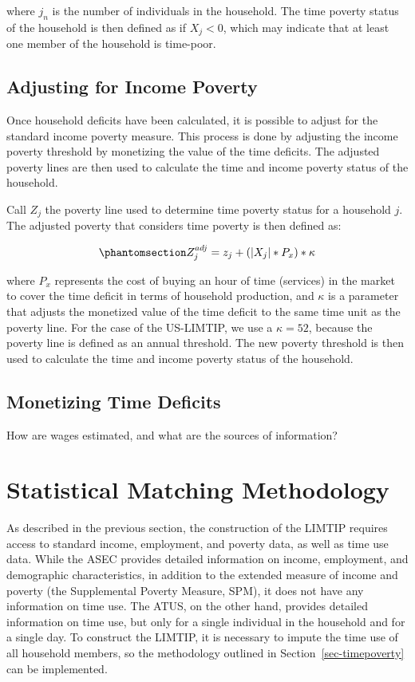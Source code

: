 \documentclass[
  11pt,
]{article}
\begin{document}
where \(j_n\) is the number of individuals in the household. The time
poverty status of the household is then defined as if \(X_j < 0\), which
may indicate that at least one member of the household is time-poor.

\subsection{Adjusting for Income
Poverty}\label{adjusting-for-income-poverty}

Once household deficits have been calculated, it is possible to adjust
for the standard income poverty measure. This process is done by
adjusting the income poverty threshold by monetizing the value of the
time deficits. The adjusted poverty lines are then used to calculate the
time and income poverty status of the household.

Call \(Z_j\) the poverty line used to determine time poverty status for
a household \(j\). The adjusted poverty that considers time poverty is
then defined as:

\begin{equation}\phantomsection\label{eq-adjpline}{Z_j^{adj} = z_j + (|X_j| * P_x)*\kappa}\end{equation}

where \(P_x\) represents the cost of buying an hour of time (services)
in the market to cover the time deficit in terms of household
production, and \(\kappa\) is a parameter that adjusts the monetized
value of the time deficit to the same time unit as the poverty line. For
the case of the US-LIMTIP, we use a \(\kappa=52\), because the poverty
line is defined as an annual threshold. The new poverty threshold is
then used to calculate the time and income poverty status of the
household.

\subsection{Monetizing Time Deficits}\label{monetizing-time-deficits}

How are wages estimated, and what are the sources of information?

\section{Statistical Matching Methodology}\label{sec-smatch}

As described in the previous section, the construction of the LIMTIP
requires access to standard income, employment, and poverty data, as
well as time use data. While the ASEC provides detailed information on
income, employment, and demographic characteristics, in addition to the
extended measure of income and poverty (the Supplemental Poverty
Measure, SPM), it does not have any information on time use. The ATUS,
on the other hand, provides detailed information on time use, but only
for a single individual in the household and for a single day. To
construct the LIMTIP, it is necessary to impute the time use of all
household members, so the methodology outlined in
Section~\ref{sec-timepoverty} can be implemented.
\end{document}
